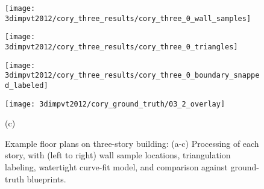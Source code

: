 \documentclass[12pt,onecolumn,oneside]{book}
\begin{document}
\begin{figure}[p]
\begin{minipage}[b]{0.24\linewidth}
  \centering
  \centerline{\texttt{[image: 3dimpvt2012/cory\_three\_results/cory\_three\_0\_wall\_samples]}}
\end{minipage}
\hfill
\begin{minipage}[b]{0.24\linewidth}
  \centering
  \centerline{\texttt{[image: 3dimpvt2012/cory\_three\_results/cory\_three\_0\_triangles]}}
\end{minipage}
\hfill
\begin{minipage}[b]{0.24\linewidth}
  \centering
  \centerline{\texttt{[image: 3dimpvt2012/cory\_three\_results/cory\_three\_0\_boundary\_snapped\_labeled]}}
\end{minipage}
\hfill
\begin{minipage}[b]{0.24\linewidth}
  \centering
  \centerline{\texttt{[image: 3dimpvt2012/cory\_ground\_truth/03\_2\_overlay]}}
\end{minipage}
\centerline{(c)}
\linebreak

\caption[Example floor plan on three-story building.]{Example floor plans on three-story building: (a-c) Processing of each story, with (left to right) wall sample locations, triangulation labeling, watertight curve-fit model, and comparison against ground-truth blueprints.}
\label{fig:cory_three_results}

\end{figure}

\end{document}
